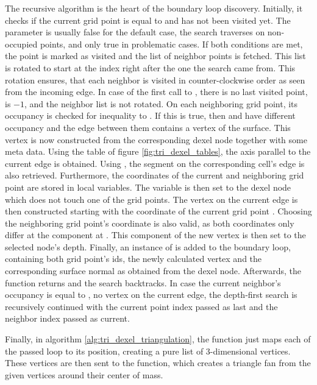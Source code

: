 The recursive  algorithm is the heart of the boundary loop discovery.
Initially, it checks if the current grid point is equal to  and has not been visited yet.
The parameter  is usually false for the default case, \ie the search traverses on non-occupied points, and only true in problematic cases.
If both conditions are met, the point is marked as visited and the list of neighbor points is fetched.
This list is rotated to start at the index right after the one the search came from.
This rotation ensures, that each neighbor is visited in counter-clockwise order as seen from the incoming edge.
In case of the first call to , there is no last visited point,  is $-1$, and the neighbor list is not rotated.
On each neighboring grid point, its occupancy is checked for inequality to .
If this is true, then  and  have different occupancy and the edge between them contains a vertex of the surface.
This vertex is now constructed from the corresponding dexel node together with some meta data.
Using the  table of figure \ref{fig:tri_dexel_tables}, the axis parallel to the current edge is obtained.
Using , the segment on the corresponding cell's edge is also retrieved.
Furthermore, the coordinates of the current and neighboring grid point are stored in local variables.
The  variable is then set to the dexel node which does not touch one of the grid points.
The vertex on the current edge is then constructed starting with the coordinate of the current grid point .
Choosing the neighboring grid point's coordinate is also valid, as both coordinates only differ at the component at .
This component of the new vertex is then set to the selected node's depth.
Finally, an instance of  is added to the boundary loop, containing both grid point's ids, the newly calculated vertex and the corresponding surface normal as obtained from the dexel node.
Afterwards, the function returns and the search backtracks.
In case the current neighbor's occupancy is equal to , \ie no vertex on the current edge, the depth-first search is recursively continued with the current point index passed as last and the neighbor index passed as current.

Finally, in algorithm \ref{alg:tri_dexel_triangulation}, the  function just maps each  of the passed loop to its position, creating a pure list of 3-dimensional vertices.
These vertices are then sent to the  function, which creates a triangle fan from the given vertices around their center of mass.

